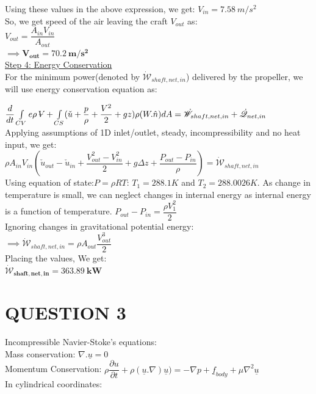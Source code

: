 \documentclass{article}
\newcommand{\volume}{\mathop{\ooalign{\hfil$V$\hfil\cr\kern0.08em--\hfil\cr}}\nolimits}
\begin{document}
\noindent Using these values in the above expression, we get: $V_{in}= 7.58 \ m/s^2$\\
\noindent So, we get speed of the air leaving the craft $V_{out}$ as: \\

$V_{out}= \dfrac{A_{in}V_{in}}{A_{out}}$\\
$\mathbf{\implies V_{out}= 70.2\  m/s^2}$\\

\noindent \underline{Step 4: Energy Conservation} \\
For the minimum power(denoted by $\dot{\mathscr{W}}_{shaft,net,in}$) delivered by the propeller, we will use energy conservation equation as: 

$\dfrac{d}{dt}\int\limits_{CV}e\rho\volume + \int\limits_{CS} ( \check{u} + \dfrac{p}{\rho}+ \dfrac{V^2}{2}+ gz)\rho(W.\hat{n})dA = \dot{\mathscr{W}}_{shaft,net,in} +\dot{\mathscr{Q}}_{net,in}$\\

\noindent Applying assumptions of 1D inlet/outlet, steady, incompressibility and no heat input, we get: \\
$ \rho A_{in}V_{in}(\check{u}_{out}- \check{u}_{in} +  \dfrac{V_{out}^2- V_{in}^2}{2} + g\Delta z +\dfrac{P_{out}-P_{in} }{\rho}) =\dot{\mathscr{W}}_{shaft,net,in}$\\

\noindent Using equation of state:$P=\rho RT$: $T_1=288.1K$ and $T_2=288.0026K$. As change in temperature is small, we can neglect changes in internal energy as internal energy is a function of temperature. $P_{out}-P_{in}=\dfrac{\rho V_1^2}{2}$\\ Ignoring changes in gravitational potential energy: \\ 

\noindent $\implies \dot{\mathscr{W}}_{shaft,net,in}= \rho A_{out}\dfrac{V_{out}^3}{2} $\\
Placing the values, We get:\\
$\mathbf{\dot{\mathscr{W}}_{shaft,net,in}= 363.89 \ kW} $

\newpage
\section{\Large QUESTION 3}

Incompressible Navier-Stoke's equations: \\

\noindent Mass conservation: $\nabla.\underline{u}=0$\\
Momentum Conservation: $\rho \dfrac{\partial u}{\partial t} + \rho (\underline{u}. \nabla) \underline{u})= -\nabla p +\underline{f}_{body} +\mu \nabla^2 \underline{u} $\\
\bigbreak 
\noindent In cylindrical coordinates: \\
 
\end{document}
